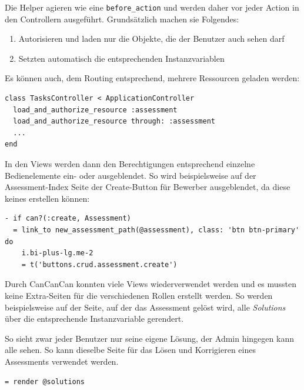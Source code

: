 Die Helper agieren wie eine \texttt{before_action} und werden daher vor jeder Action in den Controllern ausgeführt.
Grundsätzlich machen sie Folgendes:

\begin{enumerate}
  \item Autorisieren und laden nur die Objekte, die der Benutzer auch sehen darf
  \item Setzten automatisch die entsprechenden Instanzvariablen
\end{enumerate}

Es können auch, dem Routing entsprechend, mehrere Ressourcen geladen werden:
\begin{codebox}
\begin{verbatim}
class TasksController < ApplicationController
  load_and_authorize_resource :assessment
  load_and_authorize_resource through: :assessment
  ...
end
\end{verbatim}
\end{codebox}

In den Views werden dann den Berechtigungen entsprechend einzelne Bedienelemente ein- oder ausgeblendet.
So wird beispielsweise auf der Assessment-Index Seite der Create-Button für Bewerber ausgeblendet, da diese keines
erstellen können:

\begin{codebox}
\begin{verbatim}
- if can?(:create, Assessment)
  = link_to new_assessment_path(@assessment), class: 'btn btn-primary' do
    i.bi-plus-lg.me-2
    = t('buttons.crud.assessment.create')
\end{verbatim}
\end{codebox}

Durch CanCanCan konnten viele Views wiederverwendet werden und es mussten keine Extra-Seiten für die verschiedenen Rollen
erstellt werden. So werden beispielsweise auf der Seite, auf der das Assessment gelöst wird, alle
\emph{Solutions} über die entsprechende Instanzvariable gerendert. 

So sieht zwar jeder Benutzer nur seine eigene Lösung, der Admin hingegen kann alle sehen. 
So kann dieselbe Seite für das Lösen und Korrigieren eines Assessments verwendet werden.

\begin{codebox}
\begin{verbatim}
= render @solutions
\end{verbatim}
\end{codebox}
